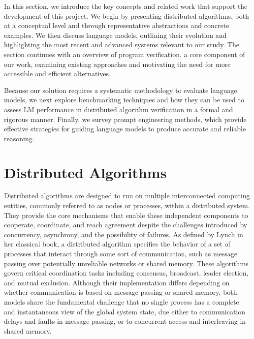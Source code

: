 \label{chap:back}
\noindent In this section, we introduce the key concepts and related work that support the development of this project. We begin by presenting distributed algorithms, both at a conceptual level and through representative abstractions and concrete examples. We then discuss language models, outlining their evolution and highlighting the most recent and advanced systems relevant to our study. The section continues with an overview of program verification, a core component of our work, examining existing approaches and motivating the need for more accessible and efficient alternatives.

Because our solution requires a systematic methodology to evaluate language models, we next explore benchmarking techniques and how they can be used to assess LM performance in distributed algorithm verification in a formal and rigorous manner. Finally, we survey prompt engineering methods, which provide effective strategies for guiding language models to produce accurate and reliable reasoning.
\section{Distributed Algorithms}
Distributed algorithms are designed to run on multiple interconnected computing entities, commonly referred to as nodes or processes, within a distributed system. They provide the core mechanisms that enable these independent components to cooperate, coordinate, and reach agreement despite the challenges introduced by concurrency, asynchrony, and the possibility of failures. As defined by Lynch in her classical book\cite{lynch1996distributed}, a distributed algorithm specifies the behavior of a set of processes that interact through some sort of communication, such as message passing over potentially unreliable networks or shared memory. These algorithms govern critical coordination tasks including consensus, broadcast, leader election, and mutual exclusion. Although their implementation differs depending on whether communication is based on message passing or shared memory, both models share the fundamental challenge that no single process has a complete and instantaneous view of the global system state, due either to communication delays and faults in message passing, or to concurrent access and interleaving in shared memory.


